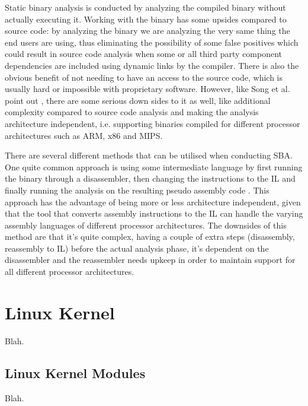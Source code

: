 Static binary analysis is conducted by analyzing the compiled binary without actually executing it.
Working with the binary has some upsides compared to source code: by analyzing the binary we are
analyzing the very same thing the end users are using, thus eliminating the possibility of some
false positives which could result in source code analysis when some or all third party component
dependencies are included using dynamic links by the compiler. There is also the obvious benefit of
not needing to have an access to the source code, which is usually hard or impossible with
proprietary software. However, like Song et al. point out \cite{song2008bitblaze}, there are some
serious down sides to it as well, like additional complexity compared to source code analysis and
making the analysis architecture independent, i.e. supporting binaries compiled for different
processor architectures such as ARM, x86 and MIPS.

There are several different methods that can be utilised when conducting SBA. One quite common
approach is using some intermediate language by first running the binary through a disassembler,
then changing the instructions to the IL and finally running the analysis on the resulting pseudo
assembly code \cite{song2008bitblaze, brumley2011bap}. This approach has the advantage of being
more or less architecture independent, given that the tool that converts assembly instructions to
the IL can handle the varying assembly languages of different processor architectures. The
downsides of this method are that it's quite complex, having a couple of extra steps (disassembly,
reassembly to IL) before the actual analysis phase, it's dependent on the disassembler and the
reassembler needs upkeep in order to maintain support for all different processor architectures.

\section{Linux Kernel}

Blah.

\subsection{Linux Kernel Modules}

Blah.
